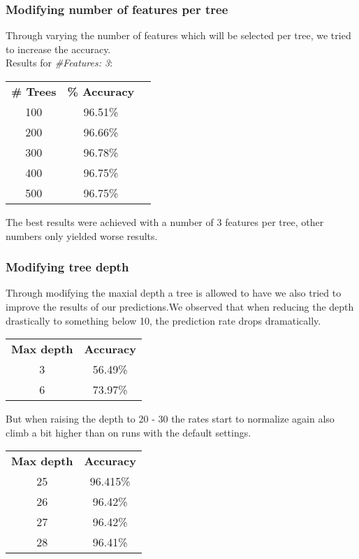 \documentclass{article}
\begin{document}
\subsubsection{Modifying number of features per tree}
Through varying the number of features which will be selected per tree, we tried to increase the accuracy. \\
Results for \emph{\#Features: 3}:\\
\begin{center}
\begin{tabular}{ c | c | c }
\textbf{\# Trees} & \textbf{\% Accuracy} \\
100 & 96.51\% \\
200 & 96.66\% \\
300 & 96.78\% \\
400 & 96.75\% \\
500 & 96.75\% \\
\end{tabular}
\end{center}
The best results were achieved with a number of 3 features per tree, other numbers only yielded worse results.

\subsubsection{Modifying tree depth}
Through modifying the maxial depth a tree is allowed to have we also tried to improve the results of our predictions.We observed that when reducing the depth drastically to something below 10, the prediction rate drops dramatically. 

\begin{center}

\begin{tabular}{c | c }
\textbf{Max depth} & \textbf{Accuracy}\\
3 & 56.49\%\\
6 & 73.97\%
\end{tabular}
\end{center}

But when raising the depth to 20 - 30 the rates start to normalize again also climb a bit higher than on runs with the default settings.
\begin{center}

\begin{tabular}{c | c }
\textbf{Max depth} & \textbf{Accuracy}\\
25 & 96.415\%\\
26 & 96.42\%\\
27 & 96.42\%\\
28 & 96.41\%\\
\end{tabular}
\end{center}
\end{document}
